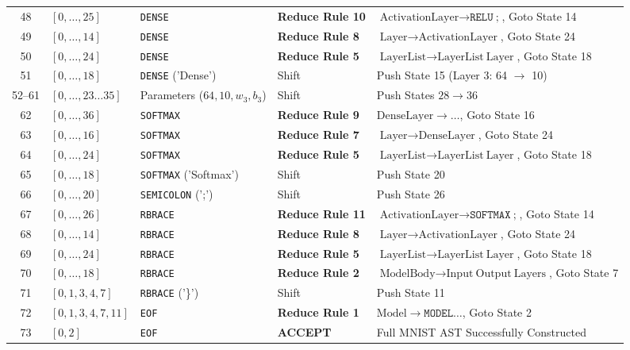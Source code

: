 \documentclass[11pt,a4paper]{article}
\begin{document}
\begin{table}[htbp]
\begin{tabular}{cllll}
48 & $[0, \dots, 25]$ & \texttt{DENSE} & \textbf{Reduce Rule 10}& $\text{ActivationLayer} \rightarrow \texttt{RELU} \ \texttt{;}$, Goto State 14 \\
49 & $[0, \dots, 14]$ & \texttt{DENSE} & \textbf{Reduce Rule 8} & $\text{Layer} \rightarrow \text{ActivationLayer}$, Goto State 24 \\
50 & $[0, \dots, 24]$ & \texttt{DENSE} & \textbf{Reduce Rule 5} & $\text{LayerList} \rightarrow \text{LayerList} \ \text{Layer}$, Goto State 18 \\
51 & $[0, \dots, 18]$ & \texttt{DENSE} ('Dense') & Shift & Push State 15 (Layer 3: 64 $\to$ 10) \\
52--61 & $[0, \dots, 23 \dots 35]$ & Parameters ($64, 10, w_3, b_3$) & Shift & Push States $28 \to 36$ \\
62 & $[0, \dots, 36]$ & \texttt{SOFTMAX} & \textbf{Reduce Rule 9} & $\text{DenseLayer} \rightarrow \dots$, Goto State 16 \\
63 & $[0, \dots, 16]$ & \texttt{SOFTMAX} & \textbf{Reduce Rule 7} & $\text{Layer} \rightarrow \text{DenseLayer}$, Goto State 24 \\
64 & $[0, \dots, 24]$ & \texttt{SOFTMAX} & \textbf{Reduce Rule 5} & $\text{LayerList} \rightarrow \text{LayerList} \ \text{Layer}$, Goto State 18 \\
65 & $[0, \dots, 18]$ & \texttt{SOFTMAX} ('Softmax') & Shift & Push State 20 \\
66 & $[0, \dots, 20]$ & \texttt{SEMICOLON} (';') & Shift & Push State 26 \\
67 & $[0, \dots, 26]$ & \texttt{RBRACE} & \textbf{Reduce Rule 11}& $\text{ActivationLayer} \rightarrow \texttt{SOFTMAX} \ \texttt{;}$, Goto State 14 \\
68 & $[0, \dots, 14]$ & \texttt{RBRACE} & \textbf{Reduce Rule 8} & $\text{Layer} \rightarrow \text{ActivationLayer}$, Goto State 24 \\
69 & $[0, \dots, 24]$ & \texttt{RBRACE} & \textbf{Reduce Rule 5} & $\text{LayerList} \rightarrow \text{LayerList} \ \text{Layer}$, Goto State 18 \\
70 & $[0, \dots, 18]$ & \texttt{RBRACE} & \textbf{Reduce Rule 2} & $\text{ModelBody} \rightarrow \text{Input} \ \text{Output} \ \text{Layers}$, Goto State 7 \\
71 & $[0, 1, 3, 4, 7]$ & \texttt{RBRACE} ('\}') & Shift & Push State 11 \\
72 & $[0, 1, 3, 4, 7, 11]$ & \texttt{EOF} & \textbf{Reduce Rule 1} & $\text{Model} \rightarrow \texttt{MODEL} \dots$, Goto State 2 \\
73 & $[0, 2]$ & \texttt{EOF} & \textbf{ACCEPT} & Full MNIST AST Successfully Constructed \\
\bottomrule
\end{tabular}
\end{table}
\end{document}
